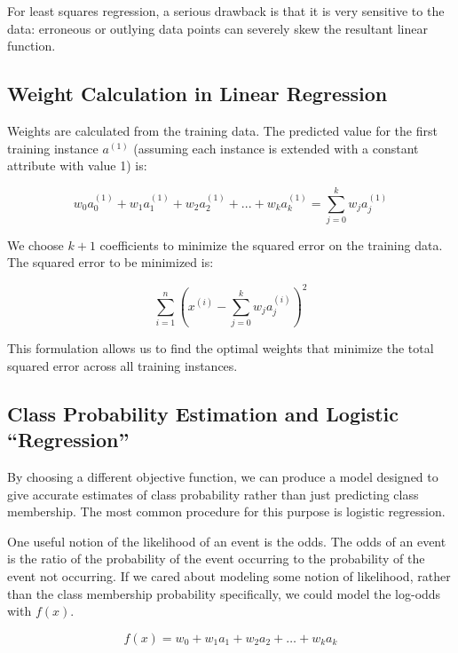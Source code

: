     For least squares regression, a serious drawback is that it is very sensitive to the data: erroneous or outlying data points can severely skew the resultant linear function.


\subsection{Weight Calculation in Linear Regression}

    Weights are calculated from the training data. The predicted value for the first training instance $a^{(1)}$ (assuming each instance is extended with a constant attribute with value 1) is:
    
    \begin{equation}
    w_0a_0^{(1)} + w_1a_1^{(1)} + w_2a_2^{(1)} + ... + w_ka_k^{(1)} = \sum_{j=0}^{k} w_ja_j^{(1)}
    \end{equation}
    
    We choose $k+1$ coefficients to minimize the squared error on the training data. The squared error to be minimized is:
    
    \begin{equation}
    \sum_{i=1}^{n} \left(x^{(i)} - \sum_{j=0}^{k} w_ja_j^{(i)}\right)^2
    \end{equation}
    
    This formulation allows us to find the optimal weights that minimize the total squared error across all training instances.


\subsection{Class Probability Estimation and Logistic ``Regression''}

    By choosing a different objective function, we can produce a model designed to give accurate estimates of class probability rather than just predicting class membership. The most common procedure for this purpose is logistic regression.
    
    One useful notion of the likelihood of an event is the odds. The odds of an event is the ratio of the probability of the event occurring to the probability of the event not occurring. If we cared about modeling some notion of likelihood, rather than the class membership probability specifically, we could model the log-odds with $f(x)$.
    
    \begin{equation}
        f(x) = w_0 + w_1 a_1 + w_2 a_2 + \ldots + w_k a_k
    \end{equation}
    
